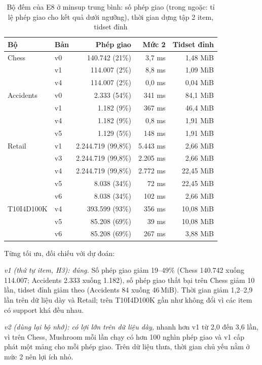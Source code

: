 \begin{table}[t]
\caption{Bộ đếm của E8 ở minsup trung bình: số phép giao (trong ngoặc: tỉ lệ phép giao cho kết quả dưới ngưỡng), thời gian dựng tập 2 item, tidset đỉnh}
\label{tab:b04}
\centering
\footnotesize
\setlength{\tabcolsep}{2.5pt}
\begin{tabular}{@{}llrrr@{}}
\toprule
Bộ & Bản & Phép giao & Mức 2 & Tidset đỉnh \\
\midrule
Chess & v0 & 140.742 (21\%) & 3,7 ms & 1,48 MiB \\
 & v1 & 114.007 (2\%) & 8,8 ms & 1,09 MiB \\
 & v4 & 114.007 (2\%) & 0,0 ms & 0,04 MiB \\
Accidents & v0 & 2.333 (54\%) & 341 ms & 84,1 MiB \\
 & v1 & 1.182 (9\%) & 367 ms & 46,4 MiB \\
 & v4 & 1.182 (9\%) & 0,8 ms & 1,91 MiB \\
 & v5 & 1.129 (5\%) & 148 ms & 1,91 MiB \\
Retail & v1 & 2.244.719 (99,8\%) & 5.443 ms & 2,66 MiB \\
 & v3 & 2.244.719 (99,8\%) & 2.205 ms & 2,66 MiB \\
 & v4 & 2.244.719 (99,8\%) & 2.772 ms & 22,45 MiB \\
 & v5 & 8.038 (34\%) & 72 ms & 22,45 MiB \\
 & v6 & 8.038 (34\%) & 102 ms & 2,66 MiB \\
T10I4D100K & v4 & 393.599 (93\%) & 356 ms & 10,08 MiB \\
 & v5 & 85.208 (69\%) & 39 ms & 10,08 MiB \\
 & v6 & 85.208 (69\%) & 267 ms & 3,88 MiB \\
\bottomrule
\end{tabular}
\end{table}

Từng tối ưu, đối chiếu với dự đoán:

\emph{v1 (thứ tự item, H3): đúng.} Số phép giao giảm 19--49\% (Chess 140.742 xuống 114.007; Accidents 2.333 xuống 1.182), số phép giao thất bại trên Chess giảm 10 lần, tidset đỉnh giảm theo (Accidents 84 xuống 46\,MiB). Thời gian giảm 1,2--2,9 lần trên dữ liệu dày và Retail; trên T10I4D100K gần như không đổi vì các item có support khá đều nhau.

\emph{v2 (dùng lại bộ nhớ): có lợi lớn trên dữ liệu dày,} nhanh hơn v1 từ 2,0 đến 3,6 lần, vì trên Chess, Mushroom mỗi lần chạy có hơn 100 nghìn phép giao và v1 cấp phát một mảng cho mỗi phép giao. Trên dữ liệu thưa, thời gian chủ yếu nằm ở mức 2 nên lợi ích nhỏ.

